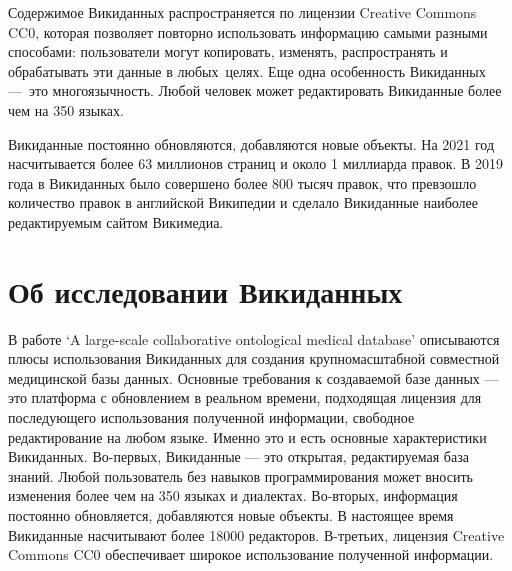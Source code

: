 Содержимое Викиданных распространяется по лицензии Creative Commons CC0, которая позволяет повторно использовать информацию самыми разными способами: пользователи могут копировать, изменять, распространять и обрабатывать эти данные в любых целях. Еще одна особенность Викиданных --- это многоязычность. Любой человек может редактировать Викиданные более чем на 350 языках.

Викиданные постоянно обновляются, добавляются новые объекты. На 2021 год насчитывается более 63 миллионов страниц и около 1 миллиарда правок. В 2019 года в Викиданных было совершено более 800 тысяч правок, что превзошло количество правок в английской Википедии и сделало Викиданные наиболее редактируемым сайтом Викимедиа\footnotemark . 
\section{Об исследовании Викиданных}
В работе ‘A large-scale collaborative ontological medical database’\cite{Collaborative_ontological_database} описываются плюсы использования Викиданных для создания крупномасштабной совместной медицинской
базы данных. Основные требования к создаваемой базе данных — это платформа с обновлением в реальном времени, подходящая лицензия для последующего использования полученной информации, свободное редактирование на любом языке. Именно это и есть основные характеристики Викиданных. Во-первых, Викиданные — это открытая, редактируемая база знаний. Любой пользователь без навыков программирования может вносить изменения более чем на 350 языках и диалектах. Во-вторых, информация постоянно обновляется, добавляются новые объекты. В настоящее время Викиданные насчитывают более 18000 редакторов. В-третьих, лицензия Creative Commons CC0 обеспечивает широкое использование полученной информации.

